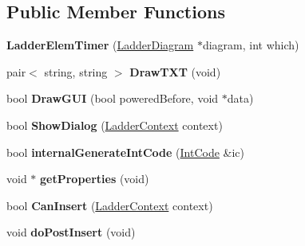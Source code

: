 \subsection*{Public Member Functions}
\begin{DoxyCompactItemize}
\item 
\hypertarget{class_ladder_elem_timer_a972ef6639f4334b17678618f4028769e}{{\bfseries Ladder\-Elem\-Timer} (\hyperlink{class_ladder_diagram}{Ladder\-Diagram} $\ast$diagram, int which)}\label{class_ladder_elem_timer_a972ef6639f4334b17678618f4028769e}

\item 
\hypertarget{class_ladder_elem_timer_aebdc4383c5a64190a8d79677d764beb4}{pair$<$ string, string $>$ {\bfseries Draw\-T\-X\-T} (void)}\label{class_ladder_elem_timer_aebdc4383c5a64190a8d79677d764beb4}

\item 
\hypertarget{class_ladder_elem_timer_ad4efb5ca163867cab8c4bf4d7110ca92}{bool {\bfseries Draw\-G\-U\-I} (bool powered\-Before, void $\ast$data)}\label{class_ladder_elem_timer_ad4efb5ca163867cab8c4bf4d7110ca92}

\item 
\hypertarget{class_ladder_elem_timer_a4bfbc6500dbe20f8d7108358e7079f48}{bool {\bfseries Show\-Dialog} (\hyperlink{struct_ladder_context}{Ladder\-Context} context)}\label{class_ladder_elem_timer_a4bfbc6500dbe20f8d7108358e7079f48}

\item 
\hypertarget{class_ladder_elem_timer_a6467b1fad85b9a327ae4e50f3940b0ba}{bool {\bfseries internal\-Generate\-Int\-Code} (\hyperlink{class_int_code}{Int\-Code} \&ic)}\label{class_ladder_elem_timer_a6467b1fad85b9a327ae4e50f3940b0ba}

\item 
\hypertarget{class_ladder_elem_timer_a2c8a9f6665c406462ae8ae39f832fe8d}{void $\ast$ {\bfseries get\-Properties} (void)}\label{class_ladder_elem_timer_a2c8a9f6665c406462ae8ae39f832fe8d}

\item 
\hypertarget{class_ladder_elem_timer_a1d7f4883d9b52788a46a4fe8e16e1d4b}{bool {\bfseries Can\-Insert} (\hyperlink{struct_ladder_context}{Ladder\-Context} context)}\label{class_ladder_elem_timer_a1d7f4883d9b52788a46a4fe8e16e1d4b}

\item 
\hypertarget{class_ladder_elem_timer_ab7e49fca6c8f3bd21b4a40a027ea28e4}{void {\bfseries do\-Post\-Insert} (void)}\label{class_ladder_elem_timer_ab7e49fca6c8f3bd21b4a40a027ea28e4}


\end{DoxyCompactItemize}
